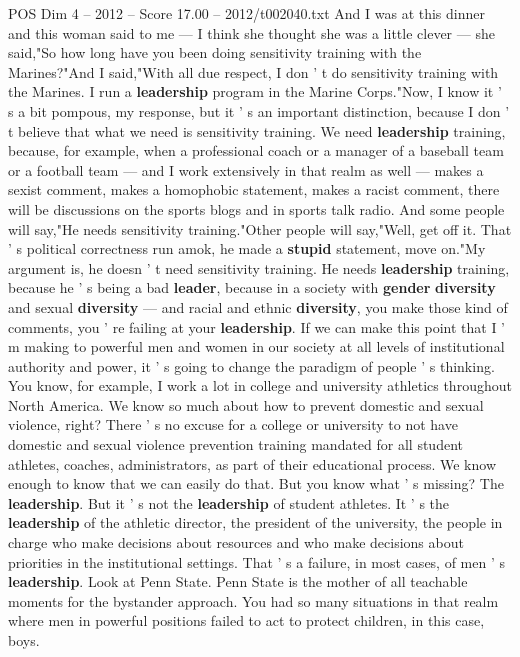\begin{textsample}{POS Dim 4 – 2012 – Score 17.00 – 2012/t002040.txt}
And I was at this dinner and this woman said to me — I think she thought she was a little clever — she said,"So how long have you been doing sensitivity training with the Marines?"And I said,"With all due respect, I don ' t do sensitivity training with the Marines.
I run a \textbf{leadership} program in the Marine Corps."Now, I know it ' s a bit pompous, my response, but it ' s an important distinction, because I don ' t believe that what we need is sensitivity training.
We need \textbf{leadership} training, because, for example, when a professional coach or a manager of a baseball team or a football team — and I work extensively in that realm as well — makes a sexist comment, makes a homophobic statement, makes a racist comment, there will be discussions on the sports blogs and in sports talk radio.
And some people will say,"He needs sensitivity training."Other people will say,"Well, get off it.
That ' s political correctness run amok, he made a \textbf{stupid} statement, move on."My argument is, he doesn ' t need sensitivity training.
He needs \textbf{leadership} training, because he ' s being a bad \textbf{leader}, because in a society with \textbf{gender} \textbf{diversity} and sexual \textbf{diversity} — and racial and ethnic \textbf{diversity}, you make those kind of comments, you ' re failing at your \textbf{leadership}.
If we can make this point that I ' m making to powerful men and women in our society at all levels of institutional authority and power, it ' s going to change the paradigm of people ' s thinking.
You know, for example, I work a lot in college and university athletics throughout North America.
We know so much about how to prevent domestic and sexual violence, right?
There ' s no excuse for a college or university to not have domestic and sexual violence prevention training mandated for all student athletes, coaches, administrators, as part of their educational process.
We know enough to know that we can easily do that.
But you know what ' s missing?
The \textbf{leadership}.
But it ' s not the \textbf{leadership} of student athletes.
It ' s the \textbf{leadership} of the athletic director, the president of the university, the people in charge who make decisions about resources and who make decisions about priorities in the institutional settings.
That ' s a failure, in most cases, of men ' s \textbf{leadership}.
Look at Penn State.
Penn State is the mother of all teachable moments for the bystander approach.
You had so many situations in that realm where men in powerful positions failed to act to protect children, in this case, boys.

\end{textsample}
